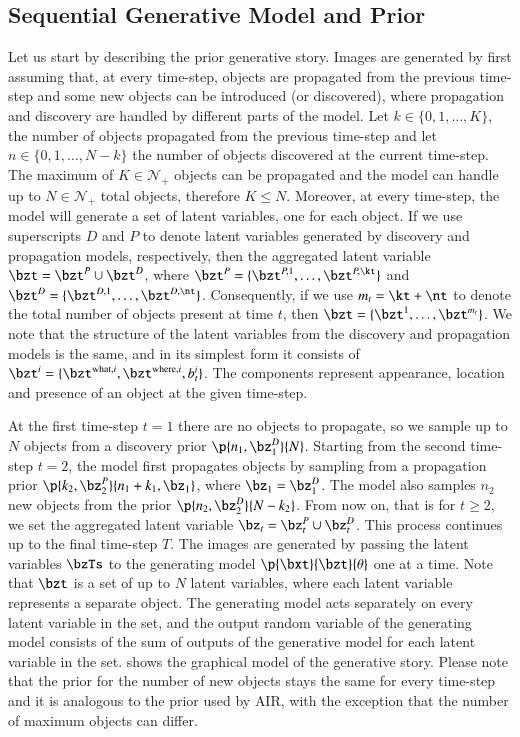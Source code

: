 \subsection{Sequential Generative Model and Prior}

Let us start by describing the prior generative story. Images are generated by first assuming that, at every time-step, objects are propagated from the previous time-step and some new objects can be introduced (or discovered), where propagation and discovery are handled by different parts of the model. Let $k \in \{0, 1, \dots, K\}$,  the number of objects propagated from the previous time-step and let $n \in \{0, 1, \dots, N - k\}$ the number of objects discovered at the current time-step. The maximum of $K \in \mathcal{N}_+$ objects can be propagated and the model can handle up to $N \in \mathcal{N}_+$ total objects, therefore $K \leq N$. Moreover, at every time-step, the model will generate a set of latent variables, one for each object. If we use superscripts $D$ and $P$ to denote latent variables generated by discovery and propagation models, respectively, then the aggregated latent variable $\bzt = \bzt^P \cup \bzt^D$, where $\bzt^P = \{ \bzt^{P, 1}, \dots, \bzt^{P, \kt} \}$ and $\bzt^D = \{ \bzt^{D, 1}, \dots, \bzt^{D, \nt} \}$. Consequently, if we use $m_t = \kt + \nt$ to denote the total number of objects present at time $t$, then $\bzt = \{ \bzt^1, \dots, \bzt^{m_t} \}$. We note that the structure of the latent variables from the discovery and propagation models is the same, and in its simplest form it consists of $\bzt^i = \{ \bzt^{\mathrm{what}, i}, \bzt^{\mathrm{where}, i}, b_t^i \}$. The components represent appearance, location and presence of an object at the given time-step.

 At the first time-step $t = 1$ there are no objects to propagate, so we sample up to $N$ objects from a discovery prior $\p{n_1, \bz_1^D}{N}$. Starting from the second time-step $t=2$, the model first propagates objects by sampling from a propagation prior $\p{k_2, \bz_2^P}{n_1 + k_1, \bz_1}$, where $\bz_1 = \bz_1^D$. The model also samples $n_2$ new objects from the prior $\p{n_2, \bz_2^D}{N - k_2}$. From now on, that is for $t \geq 2$, we set the aggregated latent variable $\bz_t = \bz_t^P \cup \bz_t^D$. This process continues up to the final time-step $T$. The images are generated by passing the latent variables $\bzTs$ to the generating model $\p{\bxt}{\bzt}{\theta}$ one at a time. Note that $\bzt$ is a set of up to $N$ latent variables, where each latent variable represents a separate object. The generating model acts separately on every latent variable in the set, and the output random variable of the generating model consists of the sum of outputs of the generative model for each latent variable in the set.  shows the graphical model of the generative story. Please note that the prior for the number of new objects stays the same for every time-step and it is analogous to the prior used by AIR, with the exception that the number of maximum objects can differ.

